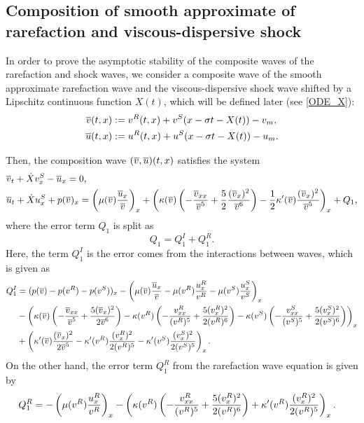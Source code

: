 \documentclass[11pt,reqno]{amsart}
\begin{document}
    
    \subsection{Composition of smooth approximate of rarefaction and viscous-dispersive shock}
    In order to prove the asymptotic stability of the composite waves of the rarefaction and shock waves, we consider a composite wave of the smooth approximate rarefaction wave and the viscous-dispersive shock wave shifted by a Lipschitz continuous function $X(t)$, which will be defined later (see \eqref{ODE_X}):
    \begin{equation*} %
    \begin{aligned}
        \ov(t,x)&:=\vr(t,x)+\vs(x-\sigma t -X(t))-v_m ,\\
        \ou(t,x)&:=\ur(t,x)+\us(x-\sigma t -X(t))-u_m.
    \end{aligned}
    \end{equation*}
   
Then, the composition wave $(\overline{v},\overline{u})(t,x)$ satisfies the system
\begin{align*}
    &\overline{v}_t+\dot{X} v^S_x-\overline{u}_x=0, \\
    &\overline{u}_t+\dot{X} u^S_x+p(\overline{v})_x= \left(\mu(\overline{v})  \dfrac{\overline{u}_x}{\overline{v}}\right)_x + \left(\kappa(\overline{v})\left(- \dfrac{\overline{v}_{xx}}{\overline{v}^{5}}+\dfrac{5}{2}\dfrac{ (\overline{v}_x)^2}{ \overline{v}^{6}}\right) -\dfrac{1}{2} \kappa'(\overline{v}) \dfrac{(\overline{v}_x)^2}{\overline{v}^5} \right)_x+Q_1,
\end{align*}
where the error term $Q_1$ is split as
\begin{equation} \label{Q1}
    Q_1=Q_1^I+Q_1^R.
\end{equation}
Here, the term $Q_1^I$ is the error comes from the interactions between waves, which is given as
\begin{equation} \label{Q1I}
\begin{aligned}
    Q_1^I&=(p(\overline{v})-p(v^R)-p(v^S))_x-\left(\mu(\overline{v})\frac{\overline{u}_x}{\overline{v}}-\mu(v^R)\frac{u^R_x}{v^R}-\mu(v^S)\frac{u^S_x}{v^S}\right)_x\\
    &-\left( \kappa(\overline{v}) \left(-\frac{\overline{v}_{xx}}{\overline{v}^5} + \frac{5(\overline{v}_x)^2}{2\overline{v}^6} \right)-\kappa(v^R) \left(-\frac{v^R_{xx}}{(v^R)^5} + \frac{5(v^R_x)^2}{2(v^R)^6} \right)-\kappa(v^S) \left(-\frac{v^S_{xx}}{(v^S)^5} + \frac{5(v^S_x)^2}{2(v^S)^6} \right)\right)_x\\
    &+\left(  \kappa'(\overline{v}) \frac{(\overline{v}_x)^2}{2\overline{v}^5} -\kappa'(v^R) \frac{(v^R_x)^2}{2(v^R)^5}-\kappa'(v^S) \frac{(v^S_x)^2}{2(v^S)^5}\right)_x.
\end{aligned}
\end{equation}
 On the other hand, the error term $Q^R_1$ from the rarefaction wave equation is given by
\begin{equation*} %
\begin{aligned}
      Q_1^R&=-\left(\mu(v^R)\frac{\ur_x}{\vr} \right)_x-\left(\kappa(v^R) \left(-\frac{\vr_{xx}}{(\vr)^5} + \frac{5(\vr_x)^2}{2(\vr)^6} \right) + \kappa'(v^R) \frac{(\vr_x)^2}{2(\vr)^5} \right)_x.
\end{aligned}       
\end{equation*}
\end{document}
